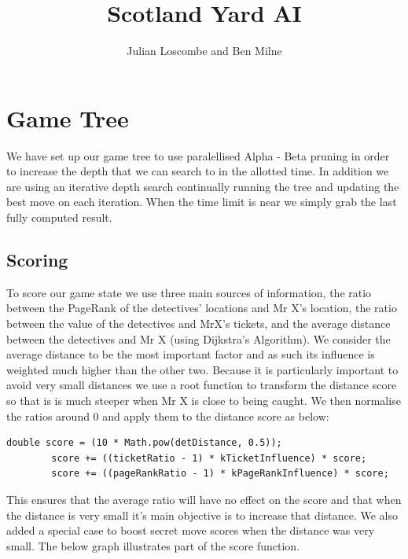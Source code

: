 \documentclass[a4paper, 12pt]{article}
\title{Scotland Yard AI}
\author{Julian Loscombe and Ben Milne}
\begin{document}
\maketitle
\section{Game Tree}
We have set up our game tree to use paralellised Alpha - Beta pruning in order to increase the depth that we can search to in the allotted time. In addition we are using an iterative depth search continually running the tree and updating the best move on each iteration. When the time limit is near we simply grab the last fully computed result.
\subsection{Scoring}
To score our game state we use three main sources of information, the ratio between the PageRank of the detectives' locations and Mr X's location, the ratio between the value of the detectives and MrX's tickets, and the average distance between the detectives and Mr X (using Dijkstra's Algorithm). We consider the average distance to be the most important factor and as such its influence is weighted much higher than the other two. Because it is particularly important to avoid very small distances we use a root function to transform the distance score so that is is much steeper when Mr X is close to being caught. We then normalise the ratios around 0 and apply them to the distance score as below:
\begin{lstlisting}
double score = (10 * Math.pow(detDistance, 0.5));
        score += ((ticketRatio - 1) * kTicketInfluence) * score;
        score += ((pageRankRatio - 1) * kPageRankInfluence) * score;
\end{lstlisting}
This ensures that the average ratio will have no effect on the score and that when the distance is very small it's main objective is to increase that distance. We also added a special case to boost secret move scores when the distance was very small. The below graph illustrates part of the score function.

\begin{figure}[!h]
\centering
{}
\end{figure}
\end{document}
